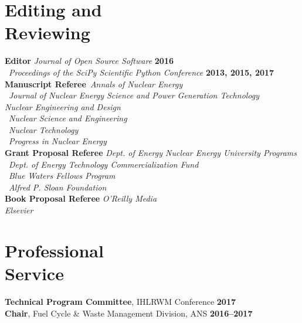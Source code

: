 \documentclass[margin,line]{resume}
\begin{document}
\begin{resume}
    \section{\mysidestyle Editing and\\Reviewing}
    \textbf{Editor} \hfill \emph{Journal of Open Source Software} \textbf{2016}\\%
                    \mbox{}~\hfill \emph{Proceedings of the SciPy Scientific 
                    Python Conference} \textbf{2013, 2015, 2017}\vspace{2mm}\\%
    \textbf{Manuscript Referee}~\hfill\emph{Annals of Nuclear Energy}\\%
                            \mbox{}~\hfill \emph{Journal of Nuclear Energy Science and Power Generation Technology} \\%
                            \mbox{}\hfill \emph{Nuclear Engineering and Design}\\%
                            \mbox{}~\hfill\emph{Nuclear Science and Engineering}\\%
                            \mbox{}~\hfill\emph{Nuclear Technology}\\%
                            \mbox{}~\hfill\emph{Progress in Nuclear Energy}\vspace{2mm}\\%
    \textbf{Grant Proposal Referee} \hfill \emph{Dept. of Energy Nuclear Energy University Programs}\\%
                            \mbox{}~\hfill\emph{Dept. of Energy Technology Commercialization Fund}\\%
                            \mbox{}~\hfill\emph{Blue Waters Fellows Program}\vspace{2mm}\\%
                            \mbox{}~\hfill\emph{Alfred P. Sloan Foundation}\vspace{2mm}\\%
    \textbf{Book Proposal Referee} \hfill\emph{O'Reilly Media}\\%
                            \mbox{}\hfill\emph{Elsevier}\vspace{2mm}\\%
    \section{\mysidestyle Professional\\Service}
		\textbf{Technical Program Committee}, IHLRWM Conference \hfill \textbf{2017}\vspace{.5mm}\\%
		\textbf{Chair}, Fuel Cycle \& Waste Management Division, ANS  \hfill \textbf{2016--2017}\vspace{.5mm}\\%

\end{resume}
\end{document}

